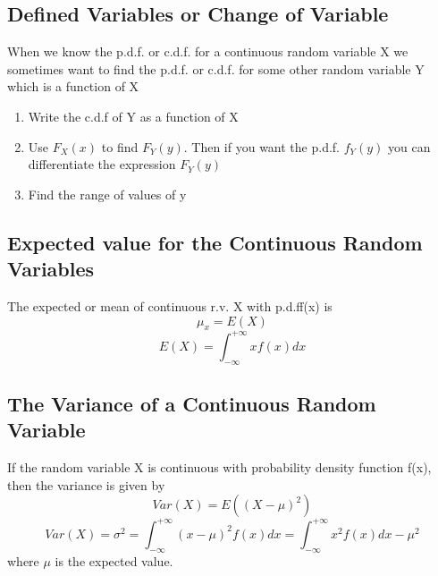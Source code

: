 \documentclass{article}
\begin{document}
\subsection{Defined Variables or Change of Variable}
When we know the p.d.f. or c.d.f. for a continuous random variable X we sometimes want to find the p.d.f. or c.d.f. for some other random variable Y which is a function of X

\begin{enumerate}
\item Write the c.d.f of Y as a function of X
\item Use \(F_X(x)\) to find \(F_Y(y)\). Then if you want the p.d.f. \(f_Y (y)\) you can differentiate the expression \(F_Y(y)\)
\item Find the range of values of y
\end{enumerate}

\subsection{Expected value for the Continuous Random Variables}
The expected or mean of continuous r.v. X with p.d.ff(x) is
$$ \mu_x = E(X) $$
$$ E(X) = \int_{-\infty}^{+\infty} x f(x) dx $$

\subsection{The Variance of a Continuous Random Variable}
If the random variable X is continuous with probability density function f(x), then the variance is given by
$$ Var(X) = E((X-\mu)^2)$$
$$ Var(X) = \sigma^2 = \int_{-\infty}^{+\infty} (x - \mu)^2 f(x) dx = \int_{-\infty}^{+\infty} x^2 f(x) dx - \mu^2 $$
where \(\mu\) is the expected value.  
\end{document}
